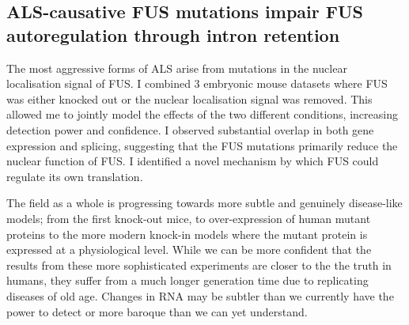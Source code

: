 \subsection{ALS-causative FUS mutations impair FUS autoregulation through intron retention}
The most aggressive forms of ALS arise from mutations in the nuclear localisation signal of FUS.
I combined 3 embryonic mouse datasets where FUS was either knocked out or the nuclear localisation signal was removed.
This allowed me to jointly model the effects of the two different conditions, increasing detection power and confidence.
I observed substantial overlap in both gene expression and splicing, suggesting that the FUS mutations primarily reduce the nuclear function of FUS.
I identified a novel mechanism by which FUS could regulate its own translation.










%

%
%
%




%


The field as a whole is progressing towards more subtle and genuinely disease-like models; from the first knock-out mice, to over-expression of human mutant proteins to the more modern knock-in models where the mutant protein is expressed at a physiological level. While we can be more confident that the results from these more sophisticated experiments are closer to the the truth in humans, they suffer from a much longer generation time due to replicating diseases of old age. Changes in RNA may be subtler than we currently have the power to detect or more baroque than we can yet understand. 



